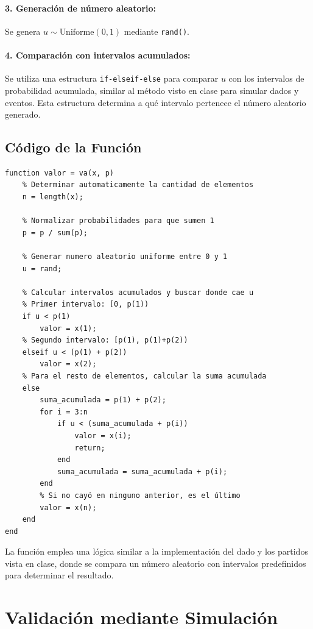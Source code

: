 \documentclass{article}
\begin{document}
    \paragraph{3. Generación de número aleatorio:}
    Se genera $u \sim \text{Uniforme}(0,1)$ mediante \texttt{rand()}.
    
    \paragraph{4. Comparación con intervalos acumulados:}
    Se utiliza una estructura \texttt{if-elseif-else} para comparar $u$ con los intervalos de probabilidad acumulada, similar al método visto en clase para simular dados y eventos. Esta estructura determina a qué intervalo pertenece el número aleatorio generado.
    
    \subsection*{Código de la Función}
    
    \begin{lstlisting}[caption={Función va(x,p) - Generador de variables aleatorias discretas}]
function valor = va(x, p)
    % Determinar automaticamente la cantidad de elementos
    n = length(x);
    
    % Normalizar probabilidades para que sumen 1
    p = p / sum(p);
    
    % Generar numero aleatorio uniforme entre 0 y 1
    u = rand;
    
    % Calcular intervalos acumulados y buscar donde cae u
    % Primer intervalo: [0, p(1))
    if u < p(1)
        valor = x(1);
    % Segundo intervalo: [p(1), p(1)+p(2))
    elseif u < (p(1) + p(2))
        valor = x(2);
    % Para el resto de elementos, calcular la suma acumulada
    else
        suma_acumulada = p(1) + p(2);
        for i = 3:n
            if u < (suma_acumulada + p(i))
                valor = x(i);
                return;
            end
            suma_acumulada = suma_acumulada + p(i);
        end
        % Si no cayó en ninguno anterior, es el último
        valor = x(n);
    end
end
    \end{lstlisting}
    
    La función emplea una lógica similar a la implementación del dado y los partidos vista en clase, donde se compara un número aleatorio con intervalos predefinidos para determinar el resultado.
    
    \section*{Validación mediante Simulación}
    
\end{document}
